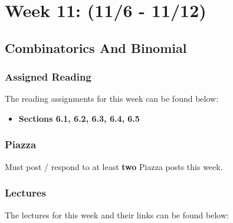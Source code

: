 \clearpage
\chapter{Week 11: (11/6 - 11/12)}

\section{Combinatorics And Binomial}

\subsection{Assigned Reading}

The reading assignments for this week can be found below:

\begin{itemize}
    \item \textbf{Sections 6.1, 6.2, 6.3, 6.4, 6.5}
\end{itemize}

\subsection{Piazza}

Must post / respond to at least \textbf{two} Piazza posts this week.  

\subsection{Lectures}

The lectures for this week and their links can be found below:

